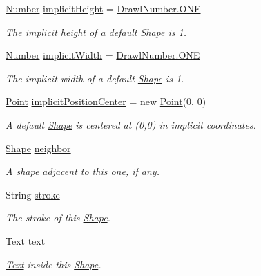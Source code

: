 \begin{DoxyCompactItemize}
\hyperlink{interfacecom_1_1aarrelaakso_1_1drawl_1_1_number}{Number} \hyperlink{classcom_1_1aarrelaakso_1_1drawl_1_1_shape_a9270317569c41e7f3f3fbe6e71df86e6}{implicit\+Height} = \hyperlink{classcom_1_1aarrelaakso_1_1drawl_1_1_drawl_number_a0cd06e1d6344869ed300bc99afcde20a}{Drawl\+Number.\+O\+NE}
\begin{DoxyCompactList}\small\item\em The implicit height of a default \hyperlink{classcom_1_1aarrelaakso_1_1drawl_1_1_shape}{Shape} is 1. \end{DoxyCompactList}\item 
\hyperlink{interfacecom_1_1aarrelaakso_1_1drawl_1_1_number}{Number} \hyperlink{classcom_1_1aarrelaakso_1_1drawl_1_1_shape_a06c9063aa0b51139910e23414428c9d6}{implicit\+Width} = \hyperlink{classcom_1_1aarrelaakso_1_1drawl_1_1_drawl_number_a0cd06e1d6344869ed300bc99afcde20a}{Drawl\+Number.\+O\+NE}
\begin{DoxyCompactList}\small\item\em The implicit width of a default \hyperlink{classcom_1_1aarrelaakso_1_1drawl_1_1_shape}{Shape} is 1. \end{DoxyCompactList}\item 
\hyperlink{classcom_1_1aarrelaakso_1_1drawl_1_1_point}{Point} \hyperlink{classcom_1_1aarrelaakso_1_1drawl_1_1_shape_af3b507f99acaa3b6b28f1e2e91409e1e}{implicit\+Position\+Center} = new \hyperlink{classcom_1_1aarrelaakso_1_1drawl_1_1_point}{Point}(0, 0)
\begin{DoxyCompactList}\small\item\em A default \hyperlink{classcom_1_1aarrelaakso_1_1drawl_1_1_shape}{Shape} is centered at (0,0) in implicit coordinates. \end{DoxyCompactList}\item 
\hyperlink{classcom_1_1aarrelaakso_1_1drawl_1_1_shape}{Shape} \hyperlink{classcom_1_1aarrelaakso_1_1drawl_1_1_shape_a57da030925a9bfc11bc49333b63a2e0f}{neighbor}
\begin{DoxyCompactList}\small\item\em A shape adjacent to this one, if any. \end{DoxyCompactList}\item 
String \hyperlink{classcom_1_1aarrelaakso_1_1drawl_1_1_shape_a7889c6cd8d073a3adad5ce6bcf8247a3}{stroke}
\begin{DoxyCompactList}\small\item\em The stroke of this \hyperlink{classcom_1_1aarrelaakso_1_1drawl_1_1_shape}{Shape}. \end{DoxyCompactList}\item 
\hyperlink{classcom_1_1aarrelaakso_1_1drawl_1_1_text}{Text} \hyperlink{classcom_1_1aarrelaakso_1_1drawl_1_1_shape_ab54afc2d95d3447532f5ecf3fec3faa8}{text}
\begin{DoxyCompactList}\small\item\em \hyperlink{classcom_1_1aarrelaakso_1_1drawl_1_1_text}{Text} inside this \hyperlink{classcom_1_1aarrelaakso_1_1drawl_1_1_shape}{Shape}. \end{DoxyCompactList}\end{DoxyCompactItemize}
